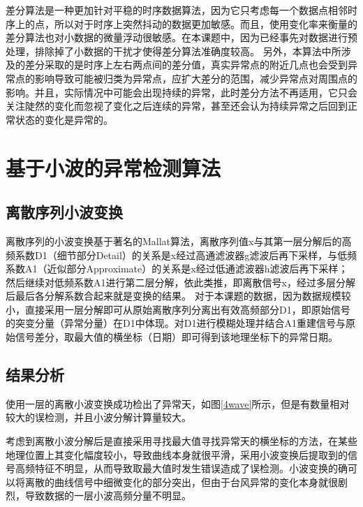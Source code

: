 \documentclass[a4paper,AutoFakeBold,oneside,12pt]{book}
\begin{document}
{{

	差分算法是一种更加针对平稳的时序数据算法，因为它只考虑每一个数据点相邻时序上的点，所以对于时序上突然抖动的数据更加敏感。而且，使用变化率来衡量的差分算法也对小数据的微量浮动很敏感。在本课题中，因为已经事先对数据进行预处理，排除掉了小数据的干扰才使得差分算法准确度较高。
	另外，本算法中所涉及的差分采取的是时序上左右两点间的差分值，真实异常点的附近几点也会受到异常点的影响导致可能被归类为异常点，应扩大差分的范围，减少异常点对周围点的影响。并且，实际情况中可能会出现持续的异常，此时差分方法不再适用，它只会关注陡然的变化而忽视了变化之后连续的异常，甚至还会认为持续异常之后回到正常状态的变化是异常的。

\section{基于小波的异常检测算法}
\subsection{离散序列小波变换}
	离散序列的小波变换基于著名的Mallat算法，离散序列值x与其第一层分解后的高频系数D1（细节部分Detail）的关系是x经过高通滤波器g滤波后再下采样，与低频系数A1（近似部分Approximate）的关系是x经过低通滤波器h滤波后再下采样；然后继续对低频系数A1进行第二层分解，依此类推，即离散信号x，经过多层分解后最后各分解系数合起来就是变换的结果。
	对于本课题的数据，因为数据规模较小，直接采用一层分解即可从原始离散序列分离出有效高频部分D1，即原始信号的突变分量（异常分量）在D1中体现。对D1进行模糊处理并结合A1重建信号与原始信号差分，取最大值的横坐标（日期）即可得到该地理坐标下的异常日期。

\subsection{结果分析}
	使用一层的离散小波变换成功检出了异常天，如图\ref{4wave}所示，但是有数量相对较大的误检测，并且小波分解计算量较大。


	考虑到离散小波分解后是直接采用寻找最大值寻找异常天的横坐标的方法，在某些地理位置上其变化幅度较小，导致曲线本身就很平滑，采用小波变换后提取到的信号高频特征不明显，从而导致取最大值时发生错误造成了误检测。小波变换的确可以将离散的曲线信号中细微变化的部分突出，但由于台风异常的变化本身就很剧烈，导致数据的一层小波高频分量不明显。

}}
\end{document}
